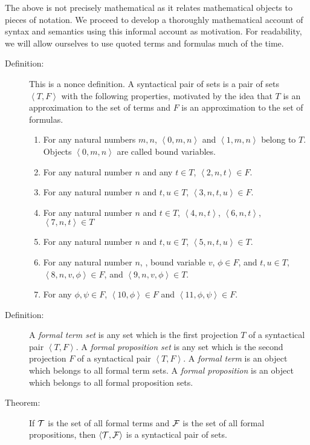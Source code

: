 \documentclass[12pt]{book}
\begin{document}
The above is not precisely mathematical as it relates mathematical
objects to pieces of notation.  We proceed to develop a thoroughly
mathematical account of syntax and semantics using this informal
account as motivation.  For readability, we will allow ourselves to
use quoted terms and formulas much of the time.

\begin{description}

\item[Definition:] This is a nonce definition.  A syntactical pair of
sets is a pair of sets $\left<T,F\right>$ with the following
properties, motivated by the idea that $T$ is an approximation to the
set of terms and $F$ is an approximation to the set of formulas.

\begin{enumerate}

\item For any natural numbers $m,n$, $\left<0,m,n\right>$ and
$\left<1,m,n\right>$ belong to $T$.  Objects $\left<0,m,n\right>$ are
called bound variables.

\item For any natural number $n$ and any $t \in T$,
$\left<2,n,t\right> \in F$.

\item For any natural number $n$ and $t,u \in T$,
$\left<3,n,t,u\right> \in F$.

\item For any natural number $n$ and $t \in T$, $\left<4,n,t\right>$,
$\left<6,n,t\right>$, $\left<7,n,t\right> \in T$

\item For any natural number $n$ and $t,u \in T$,
$\left<5,n,t,u\right> \in T$.

\item For any natural number $n$, , bound variable $v$, $\phi \in F$,
and $t,u \in T$, $\left<8,n,v,\phi\right> \in F$, and
$\left<9,n,v,\phi\right> \in T$.

\item For any $\phi,\psi \in F$, $\left<10,\phi\right>\in F$ and
$\left<11,\phi,\psi\right>\in F$.


\end{enumerate}

\item[Definition:] A {\em formal term set\/} is any set which is the
first projection $T$ of a syntactical pair $\left<T,F\right>$.  A {\em
formal proposition set\/} is any set which is the second projection
$F$ of a syntactical pair $\left<T,F\right>$.  A {\em formal term\/}
is an object which belongs to all formal term sets.  A {\em formal
proposition\/} is an object which belongs to all formal proposition
sets.

\item[Theorem:] If $\cal T$ is the set of all formal terms and $\cal
F$ is the set of all formal propositions, then $\left<{\cal T},{\cal
F}\right>$ is a syntactical pair of sets.

\end{description}
\end{document}
